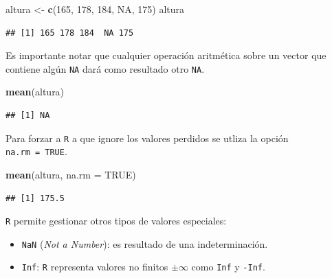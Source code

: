 \documentclass[]{book}
\newenvironment{Shaded}{\begin{snugshade}}{\end{snugshade}}
\newcommand{\DataTypeTok}[1]{\textcolor[rgb]{0.13,0.29,0.53}{#1}}
\newcommand{\DecValTok}[1]{\textcolor[rgb]{0.00,0.00,0.81}{#1}}
\newcommand{\KeywordTok}[1]{\textcolor[rgb]{0.13,0.29,0.53}{\textbf{#1}}}
\newcommand{\NormalTok}[1]{#1}
\newcommand{\OtherTok}[1]{\textcolor[rgb]{0.56,0.35,0.01}{#1}}
\newcommand{\StringTok}[1]{\textcolor[rgb]{0.31,0.60,0.02}{#1}}
\begin{document}
\begin{Shaded}
\begin{Highlighting}[]
\NormalTok{altura <-}\StringTok{ }\KeywordTok{c}\NormalTok{(}\DecValTok{165}\NormalTok{, }\DecValTok{178}\NormalTok{, }\DecValTok{184}\NormalTok{, }\OtherTok{NA}\NormalTok{, }\DecValTok{175}\NormalTok{)}
\NormalTok{altura}
\end{Highlighting}
\end{Shaded}

\begin{verbatim}
## [1] 165 178 184  NA 175
\end{verbatim}

Es importante notar que cualquier operación aritmética sobre un vector
que contiene algún \texttt{NA} dará como resultado otro \texttt{NA}.

\begin{Shaded}
\begin{Highlighting}[]
\KeywordTok{mean}\NormalTok{(altura)}
\end{Highlighting}
\end{Shaded}

\begin{verbatim}
## [1] NA
\end{verbatim}

Para forzar a \texttt{R} a que ignore los valores perdidos se utliza la opción \texttt{na.rm\ =\ TRUE}.

\begin{Shaded}
\begin{Highlighting}[]
\KeywordTok{mean}\NormalTok{(altura, }\DataTypeTok{na.rm =} \OtherTok{TRUE}\NormalTok{)}
\end{Highlighting}
\end{Shaded}

\begin{verbatim}
## [1] 175.5
\end{verbatim}

\texttt{R} permite gestionar otros tipos de valores especiales:

\begin{itemize}
\item
  \texttt{NaN} (\emph{Not a Number}): es resultado de una indeterminación.
\item
  \texttt{Inf}: \texttt{R} representa valores no finitos \(\pm \infty\) como \texttt{Inf} y \texttt{-Inf}.
\end{itemize}

\vspace*{0.3cm}
\end{document}
